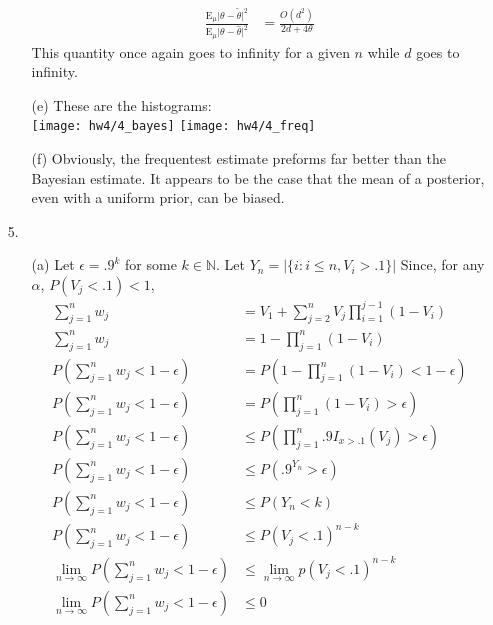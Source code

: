 \documentclass[11pt]{article}
\newcommand{\N}{\mathbb{N}}
\newcommand{\E}{\mathrm{E}}
\theoremstyle{definition}
\begin{document}
\begin{itemize}
\begin{itemize}
\begin{align*}
                    \frac{\E_\mu\vert \theta - \tilde \theta\vert^2}{\E_\mu\vert \theta - \hat \theta\vert^2} &= \frac{O(d^2)}{2d+4\theta} 
                \end{align*}
                This quantity once again goes to infinity for a given $n$ while $d$ goes to infinity.
        \item[(e)] These are the histograms: \\
            \texttt{[image: hw4/4\_bayes]} 
            \texttt{[image: hw4/4\_freq]} 
        \item[(f)] Obviously, the frequentest estimate preforms far better than the Bayesian estimate. It appears to be the case that the mean of a posterior, even with a uniform prior, can be biased. 

        \end{itemize}
    \item[5.]
        \begin{itemize}
            \item[(a)]
                Let $\epsilon = .9^{k}$ for some $k\in\N$. Let \(Y_n=\vert\{i:i\leq n,V_i>.1\}\vert\) Since, for any $\alpha$, $P(V_j<.1)<1$,
                \begin{align*}
                    \sum_{j=1}^n w_j &= V_1 + \sum_{j=2}^n V_j \prod_{i=1}^{j-1}(1-V_i) \\
                    \sum_{j=1}^n w_j &= 1 - \prod_{j=1}^{n}(1-V_i) \\
                    P\left(\sum_{j=1}^n w_j<1-\epsilon\right) &= P\left(1 - \prod_{j=1}^{n}(1-V_i)<1-\epsilon\right) \\
                    P\left(\sum_{j=1}^n w_j<1-\epsilon\right) &= P\left(\prod_{j=1}^{n}(1-V_i)>\epsilon\right) \\
                    P\left(\sum_{j=1}^n w_j<1-\epsilon\right) &\leq P\left(\prod_{j=1}^{n}.9I_{x>.1}(V_j)>\epsilon\right) \\
                    P\left(\sum_{j=1}^n w_j<1-\epsilon\right) &\leq P\left(.9^{Y_n} >\epsilon\right) \\
                    P\left(\sum_{j=1}^n w_j<1-\epsilon\right) &\leq P\left(Y_n < k\right) \\
                    P\left(\sum_{j=1}^n w_j<1-\epsilon\right) &\leq P\left(V_j<.1\right)^{n-k} \\
                    \lim_{n\to\infty}P\left(\sum_{j=1}^n w_j<1-\epsilon\right) &\leq \lim_{n\to\infty}p\left(V_j<.1\right)^{n-k} \\
                    \lim_{n\to\infty}P\left(\sum_{j=1}^n w_j<1-\epsilon\right) &\leq 0

\end{align*}
\end{itemize}
\end{itemize}
\end{document}
